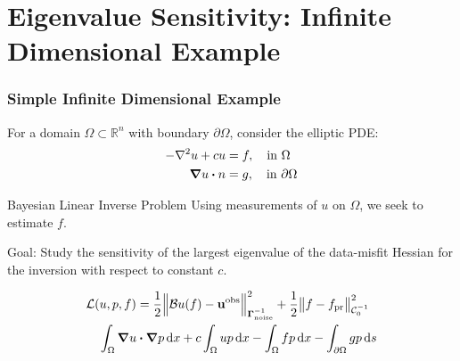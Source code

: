 \documentclass[
  pdf,
  10pt,
  xcolor={svgnames},
]{beamer}
\newcommand{\mc}[1]{\mathcal{#1}}
\newcommand{\R}{\mathbb{R}}
\newcommand{\mat}[1]{\mathbf{{#1}}}
\newcommand{\obs}{\mathbf{u}^{\rm obs}}
\newcommand{\Gnoise}{\mat{\Gamma}_{\rm noise}}
\begin{document}
\section{Eigenvalue Sensitivity: Infinite Dimensional Example}
\begin{frame}
  \frametitle{Simple Infinite Dimensional Example}
  For a domain $\Omega \subset \R^n$ with boundary $\partial \Omega$, consider the
  elliptic PDE:
  \begin{align*}
    -\laplacian u + c u & = f, \quad \text{in } \Omega         \\
    \grad u \vdot n     & = g, \quad \text{in } \partial\Omega
  \end{align*}
  \begin{alertblock}{Bayesian Linear Inverse Problem}
    Using measurements of $u$ on $\Omega$, we seek to estimate $f$.
  \end{alertblock}
  \pause
  \begin{alertblock}{Goal:}
    Study the sensitivity of the largest eigenvalue of the data-misfit Hessian
    for the inversion with respect to constant $c$.
  \end{alertblock}
  \pause
  \begin{align*}
     & \mc{L}(u,p,f)
    = \frac{1}{2} \norm{\mc{B}u(f) - \obs}_{\Gnoise^{-1}}^2
    + \frac{1}{2} \norm{f - f_{\rm pr}}_{\mc{C}_0^{-1}}^2 \\
     & \quad
    \int_\Omega \grad u \vdot \grad p \dd{x}
    + c \int_\Omega up \dd{x}
    - \int_\Omega fp \dd{x}
    - \int_{\partial\Omega} gp \dd{s}
  \end{align*}
\end{frame}
\end{document}

